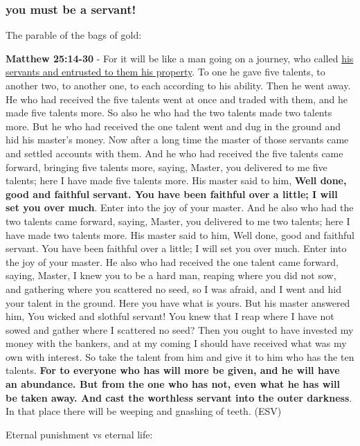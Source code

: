 \documentclass[11pt]{article}
\begin{document}
\subsubsection{you must be a servant!}
\label{sec:orgdb20cd7}
The parable of the bags of gold:

\textbf{Matthew 25:14-30} - For it will be like a man going on a journey, who called \uline{his servants and entrusted to them his property}. To one he gave five talents, to another two, to another one, to each according to his ability. Then he went away. He who had received the five talents went at once and traded with them, and he made five talents more. So also he who had the two talents made two talents more. But he who had received the one talent went and dug in the ground and hid his master's money. Now after a long time the master of those servants came and settled accounts with them. And he who had received the five talents came forward, bringing five talents more, saying, Master, you delivered to me five talents; here I have made five talents more. His master said to him, \textbf{Well done, good and faithful servant. You have been faithful over a little; I will set you over much}. Enter into the joy of your master. And he also who had the two talents came forward, saying, Master, you delivered to me two talents; here I have made two talents more. His master said to him, Well done, good and faithful servant. You have been faithful over a little; I will set you over much. Enter into the joy of your master. He also who had received the one talent came forward, saying, Master, I knew you to be a hard man, reaping where you did not sow, and gathering where you scattered no seed, so I was afraid, and I went and hid your talent in the ground. Here you have what is yours. But his master answered him, You wicked and slothful servant! You knew that I reap where I have not sowed and gather where I scattered no seed? Then you ought to have invested my money with the bankers, and at my coming I should have received what was my own with interest. So take the talent from him and give it to him who has the ten talents. \textbf{For to everyone who has will more be given, and he will have an abundance. But from the one who has not, even what he has will be taken away. And cast the worthless servant into the outer darkness}. In that place there will be weeping and gnashing of teeth. (ESV)

Eternal punishment vs eternal life:
\end{document}
